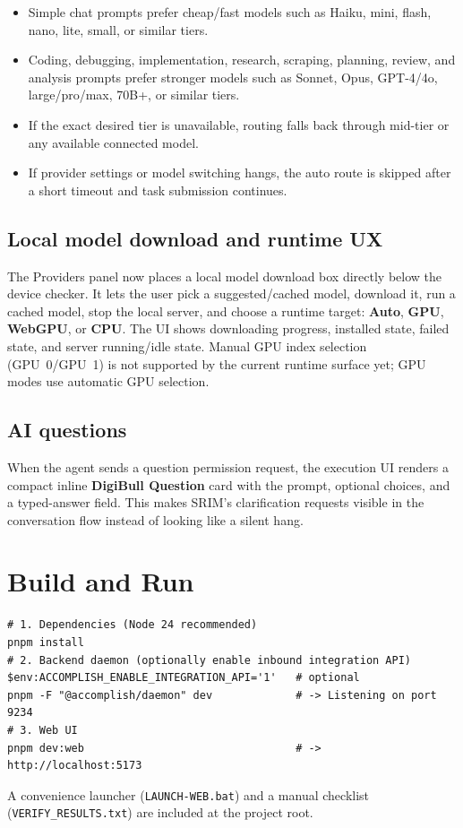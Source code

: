 \documentclass[11pt,a4paper]{article}
\begin{document}
\begin{itemize}[leftmargin=1.4em,topsep=2pt]
  \item Simple chat prompts prefer cheap/fast models such as Haiku, mini, flash,
        nano, lite, small, or similar tiers.
  \item Coding, debugging, implementation, research, scraping, planning,
        review, and analysis prompts prefer stronger models such as Sonnet,
        Opus, GPT-4/4o, large/pro/max, 70B+, or similar tiers.
  \item If the exact desired tier is unavailable, routing falls back through
        mid-tier or any available connected model.
  \item If provider settings or model switching hangs, the auto route is skipped
        after a short timeout and task submission continues.
\end{itemize}

\subsection{Local model download and runtime UX}
The Providers panel now places a local model download box directly below the
device checker. It lets the user pick a suggested/cached model, download it,
run a cached model, stop the local server, and choose a runtime target:
\textbf{Auto}, \textbf{GPU}, \textbf{WebGPU}, or \textbf{CPU}. The UI shows
downloading progress, installed state, failed state, and server running/idle
state. Manual GPU index selection (GPU~0/GPU~1) is not supported by the current
runtime surface yet; GPU modes use automatic GPU selection.

\subsection{AI questions}
When the agent sends a question permission request, the execution UI renders a
compact inline \textbf{DigiBull Question} card with the prompt, optional choices,
and a typed-answer field. This makes SRIM's clarification requests visible in
the conversation flow instead of looking like a silent hang.

\section{Build and Run}\label{sec:run}
\begin{lstlisting}
# 1. Dependencies (Node 24 recommended)
pnpm install
# 2. Backend daemon (optionally enable inbound integration API)
$env:ACCOMPLISH_ENABLE_INTEGRATION_API='1'   # optional
pnpm -F "@accomplish/daemon" dev             # -> Listening on port 9234
# 3. Web UI
pnpm dev:web                                 # -> http://localhost:5173
\end{lstlisting}
A convenience launcher (\verb|LAUNCH-WEB.bat|) and a manual checklist
(\verb|VERIFY_RESULTS.txt|) are included at the project root.
\end{document}
